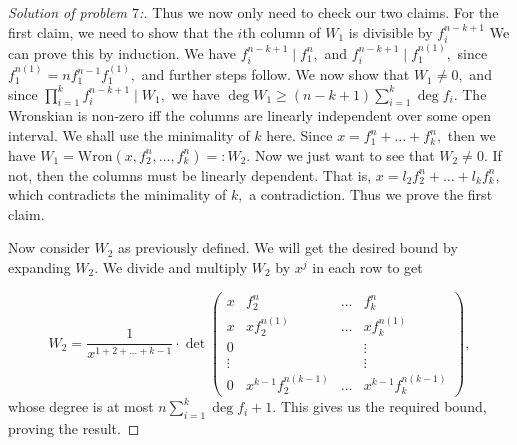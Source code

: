 \documentclass[letterpaper,11pt,twoside]{article}
\theoremstyle{proposition}
\theoremstyle{definition}
\theoremstyle{theorem}
\theoremstyle{definition}
\theoremstyle{definition}
\theoremstyle{definition}
\theoremstyle{lemma}
\theoremstyle{definition}
\theoremstyle{definition}
\theoremstyle{corollary}
\theoremstyle{definition}
\theoremstyle{definition}
\theoremstyle{definition}
\renewcommand{\div}{\;\vert\;}
\begin{document}
\begin{proof}[Solution of problem $7$:]
Thus we now only need to check our two claims. For the first claim, we need to show that the $i$th column of $W_1$ is divisible by $f_i^{n-k+1}$ We can 
prove this by induction. We have $f_i^{n-k+1} \div f_1^n,$ and $f_i^{n-k+1} \div f_1^{n(1)},$ since $f_1^{n(1)}= nf_1^{n-1} f_1^{(1)},$ and further steps 
follow. We now show that $W_1 \neq 0,$ and since $ \prod_{i=1}^k f_i^{n-k+1} \div W_1, $ we have $ \deg W_1 \geq (n-k+1) \sum_{i=1}^k \deg f_i.$ The 
Wronskian is non-zero iff the columns are linearly independent over some open interval. We shall use the minimality of $k$ here. Since $x= f_1^n + \dots + 
f_k^n,$ then we have $W_1 = \text{Wron}(x, f_2^n,\dots, f_k^n) =: W_2.$ Now we just want to see that $W_2 \neq 0.$ If not, then the columns must be linearly 
dependent. That is, $x = l_2 f_2^n + \dots + l_k f_k^n,$ which contradicts the minimality of $k,$ a contradiction. Thus we prove the first claim.

Now consider $W_2$ as previously defined. We will get the desired bound by expanding $W_2.$ We divide and multiply $W_2$ by $x^j$ in each row to get 

$$W_2= \frac{1}{x^{1+ 2+ \dots + k-1}} \cdot \det \begin{pmatrix}
	x & f_2^n & \dots & f_k^n\\
	x & xf_2^{n(1)} & \dots & x f_k^{n(1)}\\
	0 & & & \vdots \\
	\vdots & & & \vdots\\
	0 & x^{k-1}f_2^{n(k-1)}& \dots & x^{k-1} f_k^{n(k-1)}
\end{pmatrix}, $$
whose degree is at most $n \sum_{i=1}^{k}\deg f_i +1.$ This gives us the required bound, proving the result.  

 
	\end{proof}
\end{document}
